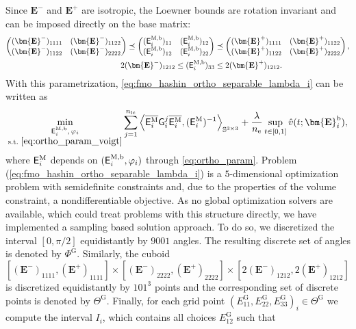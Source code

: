 \documentclass[preprint,3p]{elsarticle}
\newcommand{\tensf}[1]{\bm{\mathbf{#1}}}            %
\newcommand{\Ei}{\tensf{E}_i}                       %
\newcommand{\Emin}{\tensf{E}^{-}}                   %
\newcommand{\Emax}{\tensf{E}^{+}}                   %
\newcommand{\nel}{n_\mathrm{e}}                     %
\newcommand{\nlc}{n_\mathrm{lc}}                    %
\newcommand{\semtrx}[1]{\ifcat\noexpand#1\relax\bm{#1}\else\mathsf{#1}\fi}
\newcommand{\EiM}{\semtrx{E}_i^\mathrm{M}}          %
\newcommand{\EiMb}{\semtrx{E}_i^{\mathrm{M,b}}}  %
\begin{document}
Since $\Emin$ and $\Emax$ are isotropic, the Loewner bounds are rotation invariant and can be imposed directly on the base matrix:
%
\begin{subequations}\label{eq:ortho_param_voigt}
\begin{align}
    \begin{pmatrix}
        (\Emin)_{1111} & (\Emin)_{1122}\\
        (\Emin)_{1122} & (\Emin)_{2222}
    \end{pmatrix}
    \preceq
    \begin{pmatrix}
        (\EiMb)_{11} & (\EiMb)_{12}\\
        (\EiMb)_{12} & (\EiMb)_{22}
    \end{pmatrix}
    &\preceq
    \begin{pmatrix}
        (\Emax)_{1111} & (\Emax)_{1122}\\
        (\Emax)_{1122} & (\Emax)_{2222}
    \end{pmatrix},\\
    2(\Emin)_{1212} \leq (\EiMb)_{33} &\leq 2(\Emax)_{1212}.
\end{align}
\end{subequations}
%
With this parametrization, \eqref{eq:fmo_hashin_ortho_separable_lambda_i} can be written as
%
\begin{equation}\label{eq:fmo_hashin_ortho_separable_lambda_i2}
    \min_{\substack{\EiMb,\,\varphi_i\\ \text{s.t.\ }\eqref{eq:ortho_param_voigt}}}
    \sum_{j=1}^{\nlc} \left\langle \overline{\EiM}\semtrx{G}_i^j\overline{\EiM}, (\EiM)^{-1}\right\rangle_{\mathbb{S}^{3\times3}} + \frac{\lambda}{\nel} \sup_{t \in [0,1]} \hat{v}(t;\Ei^{\mathrm{b}}),
\end{equation}
%
where $\EiM$ depends on $(\EiMb,\varphi_i)$ through \eqref{eq:ortho_param}.
%
Problem (\ref{eq:fmo_hashin_ortho_separable_lambda_i}) is a $5$-dimensional optimization problem with semidefinite constraints and, due to the properties of the volume constraint, a nondifferentiable objective. As no global optimization solvers are available, which could treat problems with this structure directly, we have implemented a sampling based solution approach. To do so, we discretized the interval $[0,\pi/2]$ equidistantly by $9001$ angles. The resulting discrete set of angles is denoted by $\Phi^\mathrm{G}$. Similarly, the cuboid $[(\Emin)_{1111},(\Emax)_{1111}]\times [(\Emin)_{2222},(\Emax)_{2222}]\times [2(\Emin)_{1212},2(\Emax)_{1212}]$ is discretized equidistantly by $101^3$ points and the corresponding set of discrete points is denoted by $\Theta^\mathrm{G}$. Finally, for each grid point $(E^\mathrm{G}_{11},E^\mathrm{G}_{22},E^\mathrm{G}_{33})_i \in \Theta^\mathrm{G}$ we compute the interval $I_i$, which contains all choices $E_{12}^\mathrm{G}$ such that 
\end{document}
